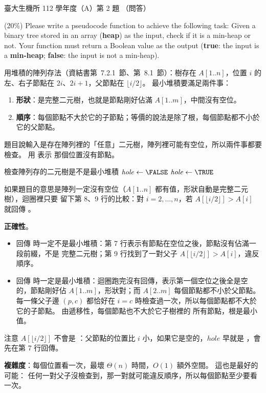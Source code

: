 \begin{pastexam}[label={px:ntu-112-bime-ds-02}]{臺大生機所 112 學年度（A）第 2 題}
（問答）

(20\%) Please write a pseudocode function to achieve the following task: Given a binary tree
stored in an array (\textbf{heap}) as the input, check if it is a min-heap or not. Your function
must return a Boolean value as the output (\textbf{true}: the input is a \textbf{min-heap};
\textbf{false}: the input is not a min-heap).
\end{pastexam}

\begin{pastsoln}
用堆積的陣列存法（資結書第~7.2.1~節、第~8.1~節）：樹存在 $A[1..n]$，位置 $i$ 的左、右子節點在
$2i$、$2i + 1$，父節點在 $\lfloor i/2 \rfloor$。 最小堆積要滿足兩件事：
\begin{enumerate}
\item \textbf{形狀}：是完整二元樹，也就是節點剛好佔滿 $A[1..m]$，中間沒有空位。
\item \textbf{順序}：每個節點不大於它的子節點；等價的說法是除了根，每個節點都不小於它的父節點。
\end{enumerate}
題目說輸入是存在陣列裡的「任意」二元樹，陣列裡可能有空位，所以兩件事都要檢查。 用 \NIL 表示
那個位置沒有節點。

\begin{pseudo}{檢查陣列存的二元樹是不是最小堆積}
 
    \State $\mathit{hole} \gets \FALSE$ 
            \State $\mathit{hole} \gets \TRUE$
            \State \Return \FALSE {}
            \State \Return \FALSE {}
        \EndIf
    \EndFor
    \State \Return \TRUE
\EndFunction
\end{pseudo}

如果題目的意思是陣列一定沒有空位（$A[1..n]$ 都有值，形狀自動是完整二元樹），迴圈裡只要
留下第 8、9 行的比較：對 $i = 2, \ldots, n$，若 $A[\lfloor i/2 \rfloor] > A[i]$ 就回傳 \FALSE。

\textbf{正確性}。
\begin{itemize}
\item 回傳 \FALSE 時一定不是最小堆積：第 7 行表示有節點在空位之後，節點沒有佔滿一段前綴，不是
完整二元樹；第 9 行找到了一對父子 $A[\lfloor i/2 \rfloor] > A[i]$，違反順序。
\item 回傳 \TRUE 時一定是最小堆積：迴圈跑完沒有回傳，表示第一個空位之後全是空的，節點剛好佔
$A[1..m]$，形狀對；而 $A[2..m]$ 每個節點都不小於父節點。 每一條父子邊 $(p, c)$ 都恰好在
$i = c$ 時檢查過一次，所以每個節點都不大於它的子節點。 由遞移性，每個節點也不大於它子樹裡的
所有節點，根是最小值。
\end{itemize}
注意 $A[\lfloor i/2 \rfloor]$ 不會是 \NIL：父節點的位置比 $i$ 小，如果它是空的，$\mathit{hole}$
早就是 \TRUE，會先在第 7 行回傳。

\textbf{複雜度}：每個位置看一次，最壞 $\Theta(n)$ 時間，$O(1)$ 額外空間。 這也是最好的可能：
任何一對父子沒檢查到，那一對就可能違反順序，所以每個節點至少要看一次。
\end{pastsoln}
